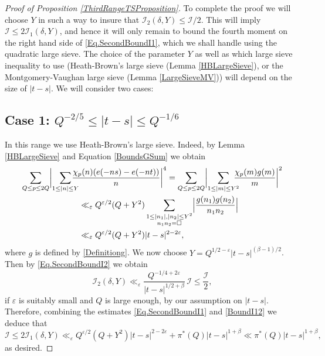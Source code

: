 \documentclass[10pt]{amsart}
\theoremstyle{plain}
\theoremstyle{definition}
\let\ep\varepsilon
\begin{document}
\begin{proof}[Proof of Proposition \ref{ThirdRangeTSProposition}]
To complete the proof we will choose $Y$ in such a way to insure that $\mathcal{I}_2(\delta, Y)\leq \mathcal{I}/2$. This will imply $\mathcal{I}\leq 2\mathcal{I}_1(\delta, Y)$, and hence it will only remain to bound the fourth moment on the right hand side of \eqref{Eq.SecondBoundI1}, which we shall handle using the quadratic large sieve. The choice of the parameter $Y$ as well as which large sieve inequality to use (Heath-Brown's large sieve (Lemma \ref{HBLargeSieve}), or the Montgomery-Vaughan large sieve (Lemma \ref{LargeSieveMV})) will depend on the size of $|t-s|$. We will consider two cases:
\subsection*{Case 1: $Q^{-2/5}\leq |t-s|\leq Q^{-1/6}$}
In this range we use Heath-Brown's large sieve. Indeed,
by Lemma \ref{HBLargeSieve} and Equation \eqref{BoundsGSum} we obtain
\begin{align}\label{BoundI12}
\sum_{Q\leq p\leq 2Q} \biggl|\sum_{1\leq |n|\leq Y}&\hspace*{-3mm} \frac{\chi_p(n) (e(-ns)-e(-nt))}{n} \biggr|^4= \sum_{Q\leq p\leq 2Q} \biggl|\sum_{1\leq |m|\leq Y^2}\hspace*{-3mm} \frac{\chi_p(m)g(m)}{m} \biggr|^2 \\
&\ll_{\ep} Q^{\ep/2} (Q+Y^2) \sum_{\substack{1\leq |n_1|, |n_2|\leq Y^2\\ n_1n_2=\square}} \Bigl|\frac{g(n_1)g(n_2)}{n_1n_2}\Bigr| \\
&\ll_{\ep} Q^{\ep/2} (Q+Y^2) |t-s|^{2-2\ep} \nonumber,
\end{align}
where $g$ is defined by \eqref{Definitiong}.
We now choose $Y=Q^{1/2-\ep}|t-s|^{(\beta-1)/2}$. Then by \eqref{Eq.SecondBoundI2} we obtain
\[
\mathcal{I}_2(\delta, Y) \ll_{\ep} \frac{Q^{-1/4+2\ep}} {|t-s|^{1/2+\beta}}\, \mathcal{I} \leq \frac{\mathcal{I}}{2}, \]
if $\ep$ is suitably small and $Q$ is large enough, by our assumption on $|t-s|$.
Therefore, combining the estimates \eqref{Eq.SecondBoundI1} and \eqref{BoundI12} we deduce that
\begin{equation}\label{BoundI0}
\mathcal{I}\leq 2 \mathcal{I}_1(\delta, Y)\ll_{\ep} Q^{\ep/2} (Q+Y^2) |t-s|^{2-2\ep} + \pi^*(Q)|t-s|^{1+\beta} \ll\pi^*(Q)|t-s|^{1+\beta},
\end{equation}
as desired.

\end{proof}
\end{document}
